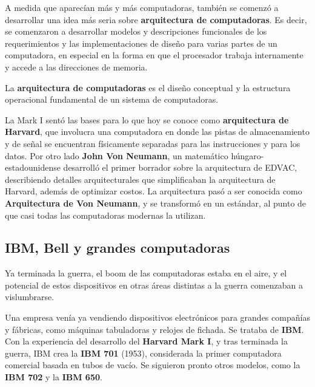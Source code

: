A medida que aparecían más y más computadoras, también se comenzó a desarrollar
una idea más seria sobre \textbf{arquitectura de computadoras}. Es decir, se
comenzaron a desarrollar modelos y descripciones funcionales de los
requerimientos y las implementaciones de diseño para varias partes de un
computadora, en especial en la forma en que el procesador trabaja internamente y
accede a las direcciones de memoria.

\begin{definition} La \textbf{arquitectura de
    computadoras} es el diseño conceptual y la estructura operacional
    fundamental de un sistema de computadoras.
\end{definition}

 La Mark I sentó las bases para lo que
hoy se conoce como \textbf{arquitectura de Harvard}, que involucra una
computadora en donde las pistas de almacenamiento y de señal se encuentran
físicamente separadas para las instrucciones y para los datos. Por otro lado
\textbf{John Von Neumann}, un matemático húngaro-estadounidense desarrolló el
primer borrador sobre la arquitectura de EDVAC, describiendo detalles
arquitecturales que simplificaban la arquitectura de Harvard, además de
optimizar costos. La arquitectura pasó a ser conocida como \textbf{Arquitectura
de Von Neumann}, y se transformó en un estándar, al punto de que casi todas las
computadoras modernas la utilizan.\autocite[sec 1.11]{patterson_2002}

\subsection{IBM, Bell y grandes computadoras}
\label{chap:historia_computadoras:subsec:grandes_computadoras}

Ya terminada la guerra, el boom de las computadoras estaba en el aire, y el
potencial de estos dispositivos en otras áreas distintas a la guerra comenzaban
a vislumbrarse.

Una empresa venía ya vendiendo dispositivos electrónicos para grandes compañías
y fábricas, como máquinas tabuladoras y relojes de fichada. Se trataba de
\textbf{IBM}. Con la experiencia del desarrollo del \textbf{Harvard Mark I}, y
tras terminada la guerra, IBM crea la \textbf{IBM 701} (1953), considerada la
primer computadora comercial basada en tubos de vacío. Se siguieron pronto otros
modelos, como la \textbf{IBM 702} y la \textbf{IBM 650}.

